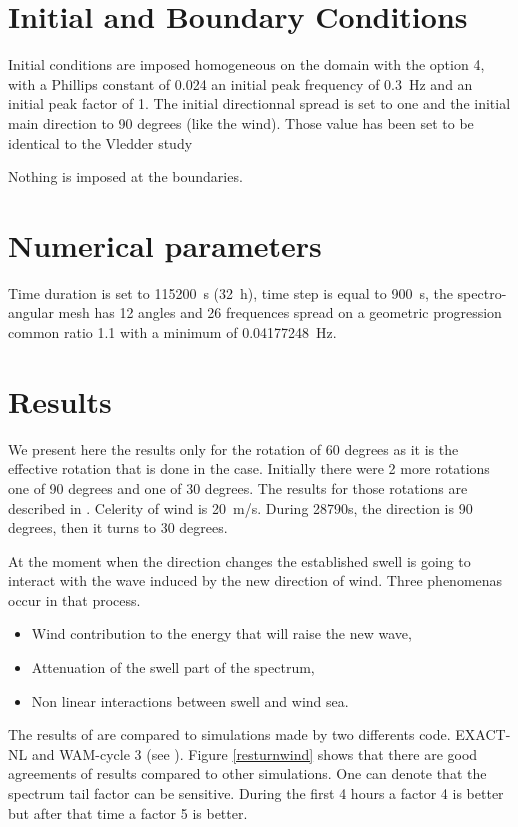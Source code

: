 \section{Initial and Boundary Conditions}
%
Initial conditions are imposed homogeneous on the domain with the option 4,
with a Phillips constant of 0.024 an initial peak frequency of 0.3~Hz  and an
initial peak factor of 1.  The initial directionnal spread is set to one and
the initial main direction to 90 degrees (like the wind).
Those value has been set to be identical to the Vledder study
\cite{Vanvledder1990}

Nothing is imposed at the boundaries.
%
%
\section{Numerical parameters}
Time duration is set to 115200~s (32~h), time step is equal to 900~s, the
spectro-angular mesh has 12 angles and 26 frequences spread on a geometric
progression common ratio 1.1 with a minimum of 0.04177248~Hz.

%
\section{Results}
%
We present here the results only for the rotation of 60 degrees as it is the
effective rotation that is done in the case. Initially there were 2 more
rotations one of 90 degrees and one of 30 degrees. The results for those
rotations are described in \cite{Benoit1996_2}.
Celerity of wind is 20~m/s. During 28790s, the direction is 90 degrees, then it
turns to 30 degrees.  

At the moment when the direction changes the established swell is going to
interact with the wave induced by the new direction of wind. Three phenomenas
occur in that process.
\begin {itemize}
\item Wind contribution to the energy that will raise the new wave,
\item Attenuation of the swell part of the spectrum,
\item Non linear interactions between swell and wind sea.
\end{itemize}

The results of \tomawac are compared to simulations made by two differents code.
EXACT-NL and WAM-cycle 3 (see \cite{Vanvledder1990}). Figure  \ref{resturnwind}
shows that there are good agreements of \tomawac results compared to other
simulations. One can denote that the spectrum tail factor can be sensitive.
During the first 4 hours a factor 4 is better but after that time a factor 5 is
better.

